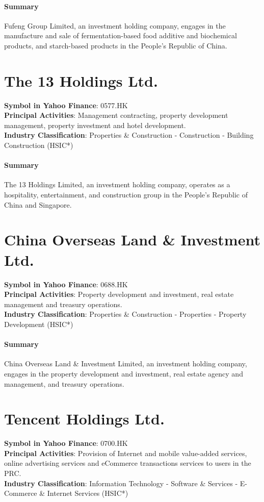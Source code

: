 \paragraph{Summary}
Fufeng Group Limited, an investment holding company, engages in the manufacture and sale of fermentation-based food additive and biochemical products, and starch-based products in the People's Republic of China.


\section{The 13 Holdings Ltd.}
\textbf{Symbol in Yahoo Finance}: 0577.HK\\
\textbf{Principal Activities}: Management contracting, property development management, property investment and hotel development.\\
\textbf{Industry Classification}: Properties \& Construction - Construction - Building Construction (HSIC*)
\paragraph{Summary}
The 13 Holdings Limited, an investment holding company, operates as a hospitality, entertainment, and construction group in the People's Republic of China and Singapore.


\section{China Overseas Land \& Investment Ltd.}
\textbf{Symbol in Yahoo Finance}: 0688.HK\\
\textbf{Principal Activities}: Property development and investment, real estate management and treasury operations.\\
\textbf{Industry Classification}: Properties \& Construction - Properties - Property Development (HSIC*)
\paragraph{Summary}
China Overseas Land \& Investment Limited, an investment holding company, engages in the property development and investment, real estate agency and management, and treasury operations.


\section{Tencent Holdings Ltd.}
\textbf{Symbol in Yahoo Finance}: 0700.HK\\
\textbf{Principal Activities}: Provision of Internet and mobile value-added services, online advertising services and eCommerce transactions services to users in the PRC.\\
\textbf{Industry Classification}: Information Technology - Software \& Services - E-Commerce \& Internet Services (HSIC*)
